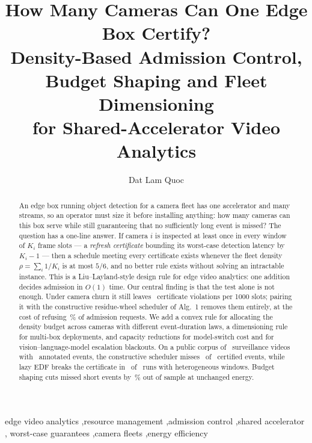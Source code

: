 \documentclass[preprint,review,12pt]{elsarticle}
\theoremstyle{definition}
\newcommand{\Ki}{K_i}
\newcommand{\dens}{\rho}
\begin{document}
\linenumbers

\begin{frontmatter}

\title{How Many Cameras Can One Edge Box Certify?\\
Density-Based Admission Control, Budget Shaping and Fleet Dimensioning\\
for Shared-Accelerator Video Analytics}

\author[fsb]{Dat Lam Quoc}
\address[fsb]{FPT School of Business and Technology, FPT University,
Ho Chi Minh City, Viet Nam}

\begin{abstract}
An edge box running object detection for a camera fleet has one accelerator and many streams, so
an operator must size it before installing anything: how many cameras can this box serve while
still guaranteeing that no sufficiently long event is missed? The question has a one-line answer.
If camera $i$ is inspected at least once in every window of $\Ki$ frame slots --- a
\emph{refresh certificate} bounding its worst-case detection latency by $\Ki-1$ --- then a
schedule meeting every certificate exists whenever the fleet density
$\dens=\sum_i 1/\Ki$ is at most $5/6$, and no better rule exists without solving an intractable
instance. This is a Liu--Layland-style design rule for edge video
analytics: one addition decides admission in $O(1)$ time. Our central finding is that the test
alone is not enough. Under camera churn it still leaves \numEfiveDensViol\ certificate violations
per 1000 slots; pairing it with the constructive residue-wheel scheduler of Alg.~1 removes them
entirely, at
the cost of refusing \numEfiveResRej\,\% of admission requests. We add a convex rule for
allocating the density budget across cameras with different event-duration laws, a dimensioning
rule for multi-box deployments, and capacity reductions for model-switch cost and for
vision--language-model escalation blackouts. On a public corpus of \numVideos\
surveillance videos with \numEvents\ annotated events, the constructive scheduler misses
\numEtwoCertMissed\ of \numEtwoCertTotal\ certified events, while lazy EDF breaks the certificate
in \numEtwoEdfHetViolRuns\ of \numEtwoEdfHetRuns\ runs with heterogeneous windows. Budget shaping
cuts missed short events by \numHoldoutGain\,\% out of sample at unchanged energy.
\end{abstract}

\begin{keyword}
edge video analytics \sep resource management \sep admission control \sep shared accelerator \sep
worst-case guarantees \sep camera fleets \sep energy efficiency
\end{keyword}

\end{frontmatter}
\end{document}
